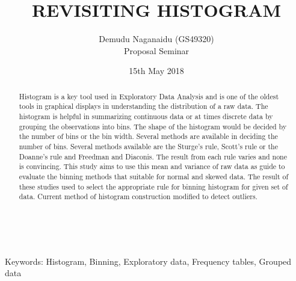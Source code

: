 \documentclass{article}
\title{REVISITING HISTOGRAM}
\author
{Demudu Naganaidu (GS49320) \\
 Proposal Seminar}
\date{15th May 2018}
\begin{document}
	\maketitle
	\begin{abstract}
		Histogram is a key tool used in Exploratory Data Analysis and is one of the oldest tools in graphical displays in understanding the distribution of a raw data. The histogram is helpful in summarizing continuous data or at times discrete data by grouping the observations into bins. The shape of the histogram would be decided by the number of bins or the bin width. Several methods are available in deciding the number of bins. Several methods available are the Sturge’s rule, Scott’s rule or the Doanne’s rule and Freedman and Diaconis. The result from each rule varies and none is convincing. This study aims to use this mean and variance of raw data as guide to evaluate the binning methods that suitable for normal and skewed data. The result of these studies used to select the appropriate rule for binning histogram for given set of data. Current method of histogram construction modified to detect outliers.
	\end{abstract}\\

	\begin{keywords}
		Keywords: Histogram, Binning, Exploratory data, Frequency tables, Grouped data \\
	\end{keywords}
\end{document}
